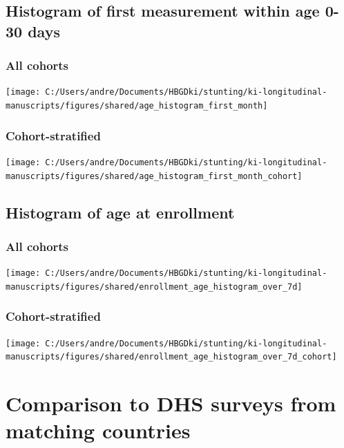 \documentclass[
  9pt,
]{book}
\begin{document}
\hypertarget{histogram-of-first-measurement-within-age-0-30-days}{%
\section{Histogram of first measurement within age 0-30 days}\label{histogram-of-first-measurement-within-age-0-30-days}}

\hypertarget{all-cohorts}{%
\subsection{All cohorts}\label{all-cohorts}}

\texttt{[image: C:/Users/andre/Documents/HBGDki/stunting/ki-longitudinal-manuscripts/figures/shared/age\_histogram\_first\_month]}

\hypertarget{cohort-stratified}{%
\subsection{Cohort-stratified}\label{cohort-stratified}}

\texttt{[image: C:/Users/andre/Documents/HBGDki/stunting/ki-longitudinal-manuscripts/figures/shared/age\_histogram\_first\_month\_cohort]}

\hypertarget{histogram-of-age-at-enrollment}{%
\section{Histogram of age at enrollment}\label{histogram-of-age-at-enrollment}}

\hypertarget{all-cohorts-1}{%
\subsection{All cohorts}\label{all-cohorts-1}}

\texttt{[image: C:/Users/andre/Documents/HBGDki/stunting/ki-longitudinal-manuscripts/figures/shared/enrollment\_age\_histogram\_over\_7d]}

\hypertarget{cohort-stratified-1}{%
\subsection{Cohort-stratified}\label{cohort-stratified-1}}

\texttt{[image: C:/Users/andre/Documents/HBGDki/stunting/ki-longitudinal-manuscripts/figures/shared/enrollment\_age\_histogram\_over\_7d\_cohort]}

\hypertarget{DHS}{%
\chapter{Comparison to DHS surveys from matching countries}\label{DHS}}
\end{document}
